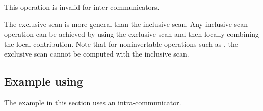 This operation is invalid for inter-communicators.%

\begin{rationale}
The exclusive scan is more general than the inclusive scan.
Any inclusive scan operation can be
achieved by using the exclusive scan and then locally combining the
local contribution.  Note that for noninvertable operations such as
, the exclusive scan cannot be computed with the
inclusive scan.
\end{rationale}

\subsection{Example using \texorpdfstring{}{MPI\_SCAN}}
\label{coll-scan-example}

The example in this section uses an intra-communicator.

